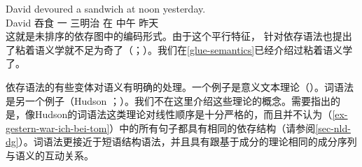 \ea
\label{ex-david-devoured-a-sandwich-at-noon-yesterday-two}
\gll David devoured a sandwich at noon yesterday.\\
David 吞食 一 三明治 在 中午 昨天\\
\z
这就是未排序的依存图中的编码形式。由于这个平行特征， \citet[]{Broeker2003a-u}针对依存语法也提出了粘着语义学就不足为奇了（\citealp*{DLS93a-u}；\citealp[\S~8]{Dalrymple2001a-u}）。我们在\ref{glue-semantics}已经介绍过粘着语义学了。

依存语法的有些变体对语义有明确的处理。一个例子是意义文本理论（\mttc）\citep{Melcuk88a-u}。词语法是另一个例子（Hudson \citeyear[\S~7]{Hudson91a-u}；\citeyear[\S~5]{Hudson2007a-u}）。我们不在这里介绍这些理论的概念。需要指出的是，像Hudson的词语法这类理论对线性顺序是十分严格的，而且并不认为（\ref{ex-gestern-war-ich-bei-tom}）中的所有句子都具有相同的依存结构（请参阅\ref{sec-nld-dg}）。词语法更接近于短语结构语法，并且具有跟基于成分的理论相同的成分序列与语义的互动关系。


